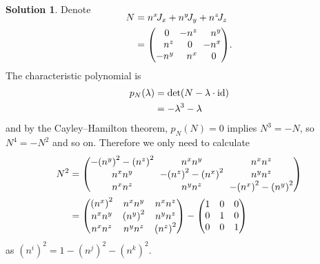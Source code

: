 \documentclass[11pt, a4paper]{report}
\theoremstyle{definition}
\newtheorem{solution}{Solution}[part]
\newenvironment{sol}{\begin{solution}}{\end{solution}\pagebreak[3]}
\newcommand*{\settightmatrix}{\ensuremath\setlength{\arraycolsep}{0.7ex}}
\newenvironment{tightmatrix}
    {\settightmatrix}{}
\newcommand*{\id}{\ensuremath\mathop{}\mathopen{}\mathrm{id}}
\begin{document}
\begin{sol}
Denote
\begin{align*}
    \SwapAboveDisplaySkip
    N &= n^x \! J_x + n^y \! J_y + n^z \! J_z \\
      &= \begin{tightmatrix}\begin{pmatrix*}[r]
            0 \phantom{^z} & -n^z  & n^y \\
            n^z            & 0 \phantom{^x} & -n^x \\
            -n^y           & n^x            & 0 \phantom{^x}
         \end{pmatrix*}\end{tightmatrix}.
\end{align*}
The characteristic polynomial is
\begin{align*}
    p_N(\lambda) &= \det(N - \lambda \cdot \id) \\
        &= -\lambda^3 - \lambda
\end{align*}
and by the Cayley--Hamilton theorem, $p_N(N) = 0$ implies $N^3 = -N$, so $N^4 = -N^2$ and so on.
Therefore we only need to calculate
\begin{align*}
    N^2 &= \begin{tightmatrix}\begin{pmatrix}
        -{(n^y)}^2 - {(n^z)}^2 & n^x n^y & n^x n^z \\
        n^x n^y & -{(n^z)}^2 - {(n^x)}^2 & n^y n^z \\
        n^x n^z & n^y n^z                & -{(n^x)}^2 - {(n^y)}^2
    \end{pmatrix}\end{tightmatrix} \\
       &= \begin{pmatrix}
        {(n^x)}^2 & n^x n^y   & n^x n^z \\
        n^x n^y   & {(n^y)}^2 & n^y n^z \\
        n^x n^z   & n^y n^z   & {(n^z)}^2
    \end{pmatrix}
    - \begin{pmatrix}
        1 & 0 & 0 \\
        0 & 1 & 0 \\
        0 & 0 & 1
    \end{pmatrix}
\end{align*}
as ${(n^i)}^2 = 1 - {(n^j)}^2 - {(n^k)}^2$.


\end{sol}
\end{document}
